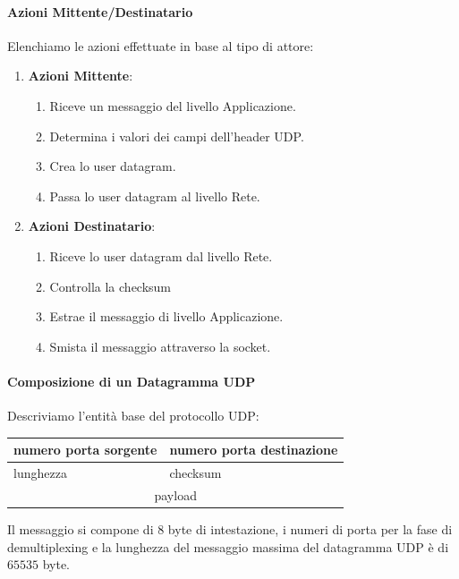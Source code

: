 \documentclass{article}
\begin{document}
\paragraph{Azioni Mittente/Destinatario} Elenchiamo le azioni effettuate in base al tipo di attore:

\begin{enumerate}
    \item \textbf{Azioni Mittente}:
    \begin{enumerate}
        \item Riceve un messaggio del livello Applicazione.
        \item Determina i valori dei campi dell'header UDP.
        \item Crea lo user datagram.
        \item Passa lo user datagram al livello Rete.
    \end{enumerate}
    \item \textbf{Azioni Destinatario}:
    \begin{enumerate}
        \item Riceve lo user datagram dal livello Rete.
        \item Controlla la checksum
        \item Estrae il messaggio di livello Applicazione.
        \item Smista il messaggio attraverso la socket.
    \end{enumerate}
\end{enumerate}

\paragraph{Composizione di un Datagramma UDP} Descriviamo l'entità base del protocollo UDP:

\vspace*{10px}

\begin{center}
    \begin{tabular}{|l|l|}
    \hline
    numero porta sorgente & numero porta destinazione \\
    \hline
    lunghezza & checksum \\
    \hline
    \multicolumn{2}{|c|}{\rule{0pt}{3em}payload\rule{0pt}{3em}} \\
    \hline
    \end{tabular}
\end{center}

\vspace*{10px}

Il messaggio si compone di $8$ byte di intestazione, i numeri di porta per la fase di demultiplexing e la lunghezza del messaggio massima del datagramma UDP è di $65535$ byte.

\newpage

\end{document}
